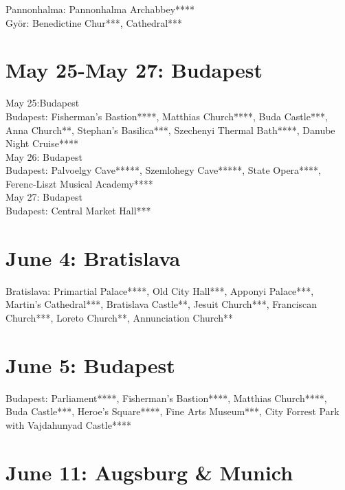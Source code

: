 Pannonhalma: Pannonhalma Archabbey****\\
Gy\"or: Benedictine Chur***, Cathedral***\\

\section{May 25-May 27: Budapest}
\label{2022:BudapestI}

May 25:Budapest\\

Budapest: Fisherman's Bastion****, Matthias Church****, Buda Castle***, Anna Church**, Stephan's Basilica***, Szechenyi Thermal Bath****, Danube Night Cruise****\\

May 26: Budapest\\

Budapest: Palvoelgy Cave*****, Szemlohegy Cave*****, State Opera****, Ferenc-Liszt Musical Academy****\\

May 27: Budapest\\

Budapest: Central Market Hall***\\

\section{June 4: Bratislava}
\label{2022:Bratislava}

Bratislava: Primartial Palace****, Old City Hall***, Apponyi Palace***, Martin's Cathedral***, Bratislava Castle**, Jesuit Church***, Franciscan Church***, Loreto Church**, Annunciation Church**\\

\section{June 5: Budapest}
\label{2022:BudapestII}

Budapest:  Parliament****, Fisherman's Bastion****, Matthias Church****, Buda Castle***, Heroe's Square****, Fine Arts Museum***, City Forrest Park with Vajdahunyad Castle****\\

\section{June 11: Augsburg \& Munich}
\label{2022:AugsburgMunich}

